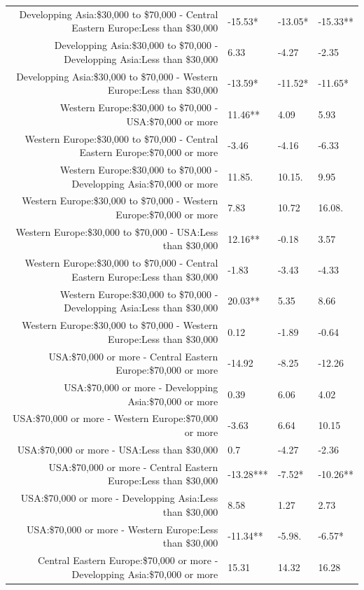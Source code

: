 \documentclass[]{report}
\begin{document}
\begin{table}[ht]
{\begin{tabular}{rlll}
		Developping Asia:\$30,000 to \$70,000 - Central Eastern Europe:Less than \$30,000 & -15.53* & -13.05* & -15.33** \\ 
		Developping Asia:\$30,000 to \$70,000 - Developping Asia:Less than \$30,000 & 6.33 & -4.27 & -2.35 \\ 
		Developping Asia:\$30,000 to \$70,000 - Western Europe:Less than \$30,000 & -13.59* & -11.52* & -11.65* \\ 
		Western Europe:\$30,000 to \$70,000 - USA:\$70,000 or more & 11.46** & 4.09 & 5.93 \\ 
		Western Europe:\$30,000 to \$70,000 - Central Eastern Europe:\$70,000 or more & -3.46 & -4.16 & -6.33 \\ 
		Western Europe:\$30,000 to \$70,000 - Developping Asia:\$70,000 or more & 11.85. & 10.15. & 9.95 \\ 
		Western Europe:\$30,000 to \$70,000 - Western Europe:\$70,000 or more & 7.83 & 10.72 & 16.08. \\ 
		Western Europe:\$30,000 to \$70,000 - USA:Less than \$30,000 & 12.16** & -0.18 & 3.57 \\ 
		Western Europe:\$30,000 to \$70,000 - Central Eastern Europe:Less than \$30,000 & -1.83 & -3.43 & -4.33 \\ 
		Western Europe:\$30,000 to \$70,000 - Developping Asia:Less than \$30,000 & 20.03** & 5.35 & 8.66 \\ 
		Western Europe:\$30,000 to \$70,000 - Western Europe:Less than \$30,000 & 0.12 & -1.89 & -0.64 \\ 
		USA:\$70,000 or more - Central Eastern Europe:\$70,000 or more & -14.92 & -8.25 & -12.26 \\ 
		USA:\$70,000 or more - Developping Asia:\$70,000 or more & 0.39 & 6.06 & 4.02 \\ 
		USA:\$70,000 or more - Western Europe:\$70,000 or more & -3.63 & 6.64 & 10.15 \\ 
		USA:\$70,000 or more - USA:Less than \$30,000 & 0.7 & -4.27 & -2.36 \\ 
		USA:\$70,000 or more - Central Eastern Europe:Less than \$30,000 & -13.28*** & -7.52* & -10.26** \\ 
		USA:\$70,000 or more - Developping Asia:Less than \$30,000 & 8.58 & 1.27 & 2.73 \\ 
		USA:\$70,000 or more - Western Europe:Less than \$30,000 & -11.34** & -5.98. & -6.57* \\ 
		Central Eastern Europe:\$70,000 or more - Developping Asia:\$70,000 or more & 15.31 & 14.32 & 16.28 \\ 

\end{tabular}}
\end{table}
\end{document}
